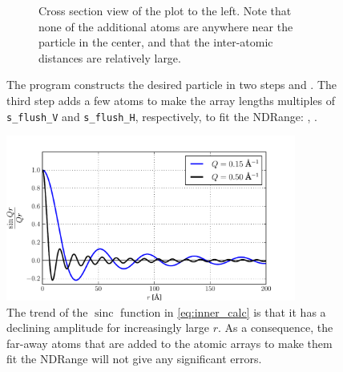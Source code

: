 \documentclass[11pt,twoside]{report}
\begin{document}
\begin{figure}[htbp]
\begin{subfigure}{0.4\textwidth}
	  \caption{Cross section view of the plot to the left. Note that none of the additional atoms are anywhere
near the particle in the center, and that the inter-atomic distances are relatively large.}
	  \label{fig:cropped_fixed_lattice_d2}	
	\end{subfigure}
	\caption{ The program constructs the desired particle in two steps  and .  The third step adds a few atoms to make the array lengths multiples of {\tt s\_flush\_V} and {\tt s\_flush\_H}, respectively, to fit the NDRange: , .}
\end{figure}
 


\begin{figure}[htbp]
	\begin{center}
		\includegraphics[width=0.85\textwidth]{img/sinc.pdf}	
	\end{center}
	\caption{The trend of the $\operatorname{sinc}$ function in \cref{eq:inner_calc} is that it has a declining amplitude for increasingly large $r$. As a consequence, the far-away atoms that are added to the atomic arrays to make them fit the NDRange will not give any significant errors.\label{fig:sinc}}
\end{figure}
\end{document}
